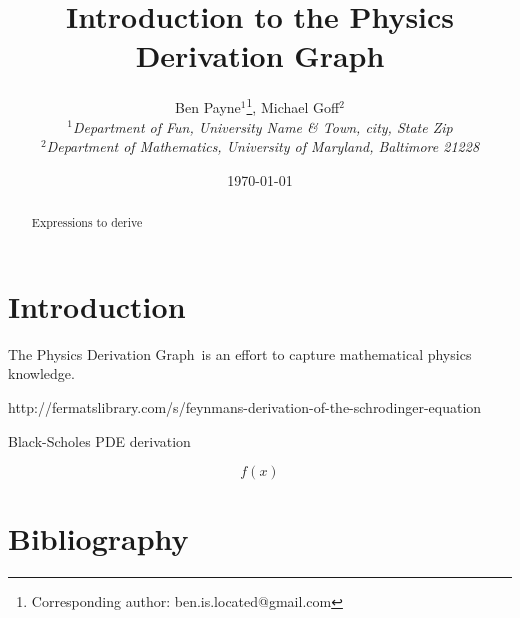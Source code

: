 \documentclass{article}
\newcommand{\pdg}{Physics Derivation Graph}
\begin{document}
\title{Introduction to the \pdg}

\author{Ben Payne$^{1}$\footnote{Corresponding author: ben.is.located@gmail.com}, Michael Goff$^{2}$\\
{\it $^{1}$Department of Fun, University Name \& Town, city, State Zip}\\
{\it $^{2}$Department of Mathematics, University of Maryland, Baltimore 21228}}

\date{\today}

\maketitle %
\begin{abstract}
Expressions to derive
\end{abstract}



\tableofcontents



\section{Introduction\label{sec:intro}}

The \pdg\ is an effort to capture mathematical physics knowledge. 


http://fermatslibrary.com/s/feynmans-derivation-of-the-schrodinger-equation


Black-Scholes PDE derivation

\begin{equation}
f(x) 
\label{eq:period_and_freq}
\end{equation}

\section{Bibliography}



\newpage
\appendix
%
\end{document}
